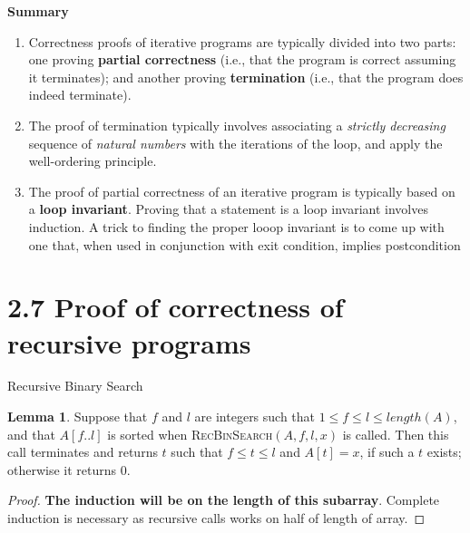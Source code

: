 \documentclass[11pt]{article}
\theoremstyle{plain}%
\theoremstyle{definition}
\newtheorem{lemma}{Lemma}[defn]
\theoremstyle{remark}
\begin{document}
\textbf{Summary}\\
\begin{enumerate}
  \item Correctness proofs of iterative programs are typically divided into two parts: one proving \textbf{partial correctness} (i.e., that the program is correct assuming it terminates); and another proving \textbf{termination} (i.e., that the program does indeed terminate).
  \item The proof of termination typically involves associating a \textit{strictly decreasing} sequence of \textit{natural numbers} with the iterations of the loop, and apply the well-ordering principle.
  \item The proof of partial correctness of an iterative program is typically based on a \textbf{loop invariant}. Proving that a statement is a loop invariant involves induction. A trick to finding the proper looop invariant is to come up with one that, when used in conjunction with exit condition, implies postcondition
\end{enumerate}

\section*{2.7 Proof of correctness of recursive programs}

\begin{algorithm}[H]
    \label{recBinSearch Algorithm}
    \caption{Recursive Binary Search}
    \DontPrintSemicolon

\end{algorithm}

\begin{lemma}
  Suppose that $f$ and $l$ are integers such that $1 \leq f \leq l \leq length(A)$, and that $A[f..l]$ is sorted when \textsc{RecBinSearch}$(A, f, l, x)$ is called. Then this call terminates and returns $t$ such that $f \leq t \leq l$ and $A[t] = x$, if such a $t$ exists; otherwise it returns 0.
  \begin{proof}
    \textbf{The induction will be on the length of this subarray}. Complete induction is necessary as recursive calls works on half of length of array.
  \end{proof}
\end{lemma}
\end{document}
